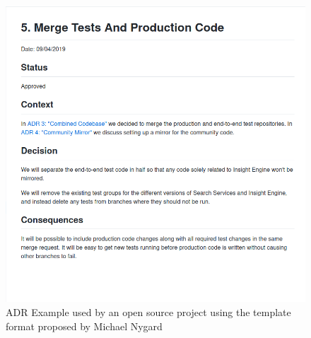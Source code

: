         \begin{figure}
            \includegraphics[scale=0.5]{figures/ADR_Example.png}
            \caption{ADR Example used by an open source project using the template format proposed by Michael Nygard}
            \label{fig:ADR_Example_MN}
        \end{figure}

